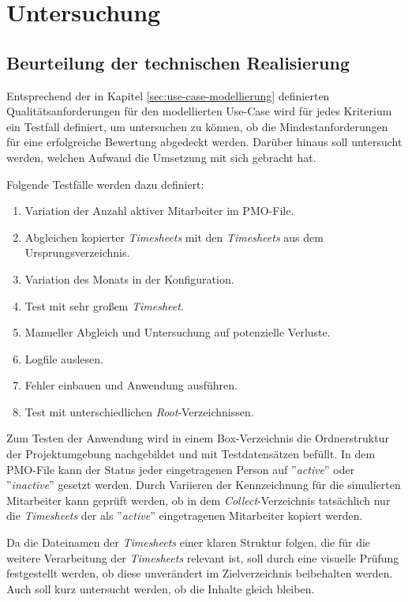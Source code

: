 \chapter{Untersuchung}
\label{chap:untersuchung}

\section{Beurteilung der technischen Realisierung}
Entsprechend der in Kapitel \ref{sec:use-case-modellierung} definierten Qualitätsanforderungen für den modellierten Use-Case wird für jedes Kriterium ein Testfall definiert, um untersuchen zu können, ob die Mindestanforderungen für eine erfolgreiche Bewertung abgedeckt werden. Darüber hinaus soll untersucht werden, welchen Aufwand die Umsetzung mit sich gebracht hat.

Folgende Testfälle werden dazu definiert:
\begin{enumerate}
    \item Variation der Anzahl aktiver Mitarbeiter im PMO-File.
    \item Abgleichen kopierter \textit{\glspl{Timesheet}} mit den \textit{\glspl{Timesheet}} aus dem Ursprungsverzeichnis.
    \item Variation des Monats in der Konfiguration.
    \item Test mit sehr großem \textit{\gls{Timesheet}}.
    \item Manueller Abgleich und Untersuchung auf potenzielle Verluste.
    \item Logfile auslesen.
    \item Fehler einbauen und Anwendung ausführen.
    \item Test mit unterschiedlichen \textit{Root}-Verzeichnissen.
\end{enumerate}

Zum Testen der Anwendung wird in einem \gls{Box}-Verzeichnis die Ordnerstruktur der Projektumgebung nachgebildet und mit Testdatensätzen befüllt. In dem PMO-File kann der Status jeder eingetragenen Person auf ''\textit{active}'' oder ''\textit{inactive}'' gesetzt werden. Durch Variieren der Kennzeichnung für die simulierten Mitarbeiter kann geprüft werden, ob in dem \textit{Collect}-Verzeichnis tatsächlich nur die \textit{\glspl{Timesheet}} der als ''\textit{active}'' eingetragenen Mitarbeiter kopiert werden.

Da die Dateinamen der \textit{\glspl{Timesheet}} einer klaren Struktur folgen, die für die weitere Verarbeitung der \textit{\glspl{Timesheet}} relevant ist, soll durch eine visuelle Prüfung festgestellt werden, ob diese unverändert im Zielverzeichnis beibehalten werden. Auch soll kurz untersucht werden, ob die Inhalte gleich bleiben.

